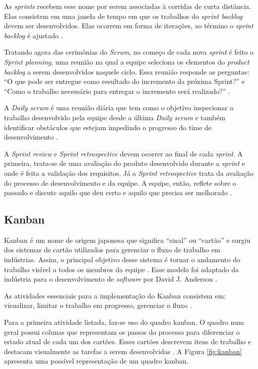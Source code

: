 \documentclass[
    12pt,       %
    openright,      %
    twoside,      %
    a4paper,      %
    english,      %
    french,       %
    spanish,      %
    brazil,       %
    ]{abntex2}
\begin{document}
As \textit{sprints} recebem esse nome por serem associadas à corridas de curta distância. Elas consistem em uma janela de tempo em que os trabalhos do \textit{sprint backlog} devem ser desenvolvidos. Elas ocorrem em forma de iterações, ao término o \textit{sprint backlog} é ajustado \cite{PRESSMAN:2011}.

Tratando agora das cerimônias do \textit{Scrum}, no começo de cada nova \textit{sprint} é feito o \textit{Sprint planning}, uma reunião na qual a equipe seleciona os elementos do \textit{product backlog} a serem desenvolvidos naquele ciclo. Essa reunião responde as perguntas: ``O que pode ser entregue como resultado do incremento da próxima Sprint?'' e ``Como o trabalho necessário para entregar o incremento será realizado?'' \cite{Sutherland:2013}.

A \textit{Daily scrum} é uma reunião diária que tem como o objetivo inspecionar o trabalho desenvolvido pela equipe desde a última \textit{Daily scrum} e também identificar obstáculos que estejam impedindo o progresso do time de desenvolvimento \cite{Sutherland:2013}. 

A \textit{Sprint review} e \textit{Sprint retrospective} devem ocorrer ao final de cada \textit{sprint}. A primeira, trata-se de uma avaliação do produto desenvolvido durante a \textit{sprint} e onde é feita a validação dos requisitos. Já a \textit{Sprint retrospective} trata da avaliação do processo de desenvolvimento e da equipe. A equipe, então, reflete sobre o passado e discute aquilo que deu certo e aquilo que precisa ser melhorado \cite{WAZLAWICK:2013}.

\subsection{Kanban}

Kanban é um nome de origem japonesa que significa ``sinal'' ou ``cartão'' e surgiu dos sistemas de cartão utilizados para gerenciar o fluxo de trabalho em indústrias. Assim, o principal objetivo desse sistema é tornar o andamento do trabalho visível a todos os membros da equipe \cite{Mariotti:2012}. Esse modelo foi adaptado da indústria para o desenvolvimento de \textit{software} por David J. Anderson \cite{Ghisi:2012}. 

As atividades essenciais para a implementação do Kanban consistem em: visualizar, limitar o trabalho em progresso, gerenciar o fluxo \cite{Mariotti:2012}. 

Para a primeira atividade listada, faz-se uso do quadro kanban. O quadro num geral possui colunas que representam os passos do processo para diferenciar o estado atual de cada um dos cartões. Esses cartões descrevem itens de trabalho e destacam visualmente as tarefas a serem desenvolvidas \cite{ANDERSON:2016}. A Figura \ref{fig:kanban} apresenta uma possível representação de um quadro kanban.
\end{document}
